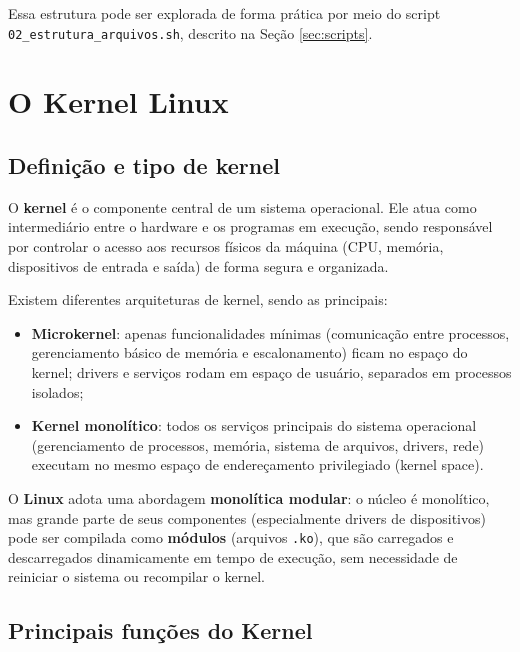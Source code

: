 \documentclass[a4paper,12pt]{article}
\begin{document}
Essa estrutura pode ser explorada de forma prática por meio do script
\texttt{02\-\_es\-tru\-tu\-ra\-\_ar\-qui\-vos.sh}, descrito na Seção
\ref{sec:scripts}.


\section{O Kernel Linux}

\subsection{Definição e tipo de kernel}

O \textbf{kernel} é o componente central de um sistema operacional. Ele atua
como intermediário entre o hardware e os programas em execução, sendo
responsável por controlar o acesso aos recursos físicos da máquina (CPU,
memória, dispositivos de entrada e saída) de forma segura e organizada.

Existem diferentes arquiteturas de kernel, sendo as principais:

\begin{itemize}
    \item \textbf{Microkernel}: apenas funcionalidades mínimas (comunicação
          entre processos, gerenciamento básico de memória e
          escalonamento) ficam no espaço do kernel; drivers e serviços
          rodam em espaço de usuário, separados em processos isolados;
    \item \textbf{Kernel monolítico}: todos os serviços principais do
          sistema operacional (gerenciamento de processos, memória,
          sistema de arquivos, drivers, rede) executam no mesmo espaço de
          endereçamento privilegiado (kernel space).
\end{itemize}

O \textbf{Linux} adota uma abordagem \textbf{monolítica modular}: o núcleo é
monolítico, mas grande parte de seus componentes (especialmente drivers de
dispositivos) pode ser compilada como \textbf{módulos} (arquivos
\texttt{.ko}), que são carregados e descarregados dinamicamente em tempo de
execução, sem necessidade de reiniciar o sistema ou recompilar o kernel.

\subsection{Principais funções do Kernel}
\end{document}
